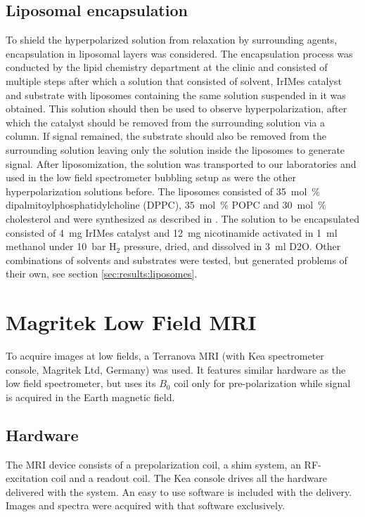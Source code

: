         \subsection{Liposomal encapsulation}
        \label{sec:matMeth:liposomes}
    To shield the hyperpolarized solution from relaxation by surrounding agents, encapsulation in liposomal layers was considered. The encapsulation process was conducted by the lipid chemistry department at the clinic and consisted of multiple steps after which a solution that consisted of solvent, IrIMes catalyst and substrate with liposomes containing the same solution suspended in it was obtained. This solution should then be used to observe hyperpolarization, after which the catalyst should be removed from the surrounding solution via a column. If signal remained, the substrate should also be removed from the surrounding solution leaving only the solution inside the liposomes to generate signal. After liposomization, the solution was transported to our laboratories and used in the low field spectrometer bubbling setup as were the other hyperpolarization solutions before.
    The liposomes consisted of \SI{35}{\mole\percent} dipalmitoylphosphatidylcholine (DPPC), \SI{35}{\mole\percent} POPC and \SI{30}{\mole\percent} cholesterol and were synthesized as described in \cite{putz_synthesis_2005}. The solution to be encapsulated consisted of \SI{4}{\milli\g} IrIMes catalyst and \SI{12}{\milli\g} nicotinamide activated in \SI{1}{\milli\l} methanol under \SI{10}{\bar} H$_2$ pressure, dried, and dissolved in \SI{3}{\milli\l} D2O. Other combinations of solvents and substrates were tested, but generated problems of their own, see section \ref{sec:results:liposomes}.
    \section{Magritek Low Field MRI}
    \label{sec:matMeth:magritek}
    To acquire images at low fields, a Terranova MRI (with Kea spectrometer console, Magritek Ltd, Germany) was used. It features similar hardware as the low field spectrometer, but uses its $B_0$ coil only for pre-polarization while signal is acquired in the Earth magnetic field.
        \subsection{Hardware}
            The MRI device consists of a prepolarization coil, a shim system, an RF-excitation coil and a readout coil. The Kea console drives all the hardware delivered with the system. An easy to use software is included with the delivery. Images and spectra were acquired with that software exclusively.
